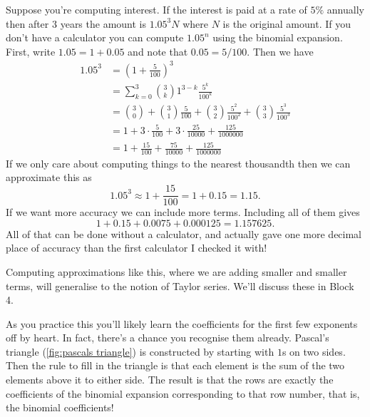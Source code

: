 \documentclass[fleqn]{LectureClass/LectureClass}
\begin{document}
     \begin{exm}{}{}
         Suppose you're computing interest.
         If the interest is paid at a rate of \(5\%\) annually then after \(3\) years the amount is \(1.05^3N\) where \(N\) is the original amount.
         If you don't have a calculator you can compute \(1.05^n\) using the binomial expansion.
         First, write \(1.05 = 1 + 0.05\) and note that \(0.05 = 5/100\).
         Then we have
         \begin{align}
             1.05^3 &= \left( 1 + \frac{5}{100} \right)^3\\
             &= \sum_{k=0}^{3} \binom{3}{k} 1^{3 - k} \frac{5^k}{100^k}\\
             &= \binom{3}{0} + \binom{3}{1} \frac{5}{100} + \binom{3}{2} \frac{5^2}{100^2} + \binom{3}{3} \frac{5^3}{100^3}\\
             &= 1 + 3 \cdot \frac{5}{100} + 3 \cdot \frac{25}{10000} + \frac{125}{1000000}\\
             &= 1 + \frac{15}{100} + \frac{75}{10000} + \frac{125}{1000000}
         \end{align}
         If we only care about computing things to the nearest thousandth then we can approximate this as
         \begin{equation}
             1.05^3 \approx 1 + \frac{15}{100} = 1 + 0.15 = 1.15.
         \end{equation}
         If we want more accuracy we can include more terms.
         Including all of them gives
         \begin{equation}
             1 + 0.15 + 0.0075 + 0.000125 = 1.157625.
         \end{equation}
         All of that can be done without a calculator, and actually gave one more decimal place of accuracy than the first calculator I checked it with!
     \end{exm}
     
     \begin{remark}{}{}
         Computing approximations like this, where we are adding smaller and smaller terms, will generalise to the notion of Taylor series.
         We'll discuss these in Block 4.
     \end{remark}
     
     As you practice this you'll likely learn the coefficients for the first few exponents off by heart.
     In fact, there's a chance you recognise them already.
     Pascal's triangle (\cref{fig:pascals triangle}) is constructed by starting with \(1\)s on two sides.
     Then the rule to fill in the triangle is that each element is the sum of the two elements above it to either side.
     The result is that the rows are exactly the coefficients of the binomial expansion corresponding to that row number, that is, the binomial coefficients!
     
\end{document}

